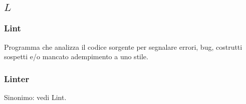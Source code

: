 \subsection*{\quad$L\quad$}
\subsubsection*{Lint}
Programma che analizza il codice sorgente per segnalare errori, bug, costrutti sospetti e/o mancato adempimento a uno stile.

\subsubsection*{Linter}
Sinonimo: vedi Lint\glo.

